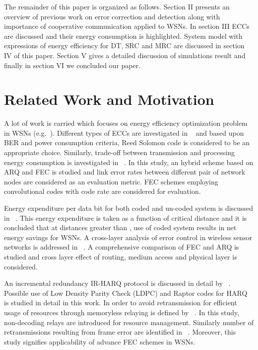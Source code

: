 \documentclass{sig-alternate}
\begin{document}
The remainder of this paper is organized as follows. Section II presents an overview of previous work on error correction and detection along with importance of cooperative communication applied to WSNs. In section III ECCs are discussed and their energy consumption is highlighted. System model with expressions of energy efficiency for DT, SRC and MRC are discussed in section IV of this paper. Section V gives a detailed discussion of simulations result and finally in section VI we concluded our paper.

\section{Related Work and Motivation}
\label{sec:format}

A lot of work is carried which focuses on energy efficiency optimization problem in WSNs (e.g.~\cite{11, 12, 14, 16}). Different types of ECCs are investigated in ~\cite{2} and based upon BER and power consumption criteria, Reed Solomon code  is considered to be an appropriate choice. Similarly, trade-off between transmission and processing energy consumption is investigated in ~\cite{4}. In this study, an hybrid scheme based on ARQ and FEC is studied and link error rates between different pair of network nodes are considered as an evaluation metric. FEC schemes employing convolutional codes with code rate  are considered for evaluation.

Energy expenditure per data bit for both coded and un-coded system is discussed in ~\cite{1}. This energy expenditure is taken as a function of critical distance  and it is concluded that at distances greater than , use of coded system results in net energy savings for WSNs. A cross-layer analysis of error control in wireless sensor networks is addressed in ~\cite{8}. A comprehensive comparison of FEC and ARQ is studied and cross layer effect of routing, medium access and physical layer is considered.

An incremental redundancy IR-HARQ protocol is discussed in detail by ~\cite{3}. Possible use of Low Density Parity Check (LDPC) and Raptor codes for HARQ is studied in detail in this work. In order to avoid retransmission for efficient usage of resources through memoryless relaying is defined by ~\cite{9}. In this study, non-decoding relays are introduced for resource management. Similarly number of retransmissions resulting from frame error are identified in ~\cite{5}. Moreover, this study signifies applicability of advance FEC schemes in WSNs.
\end{document}
